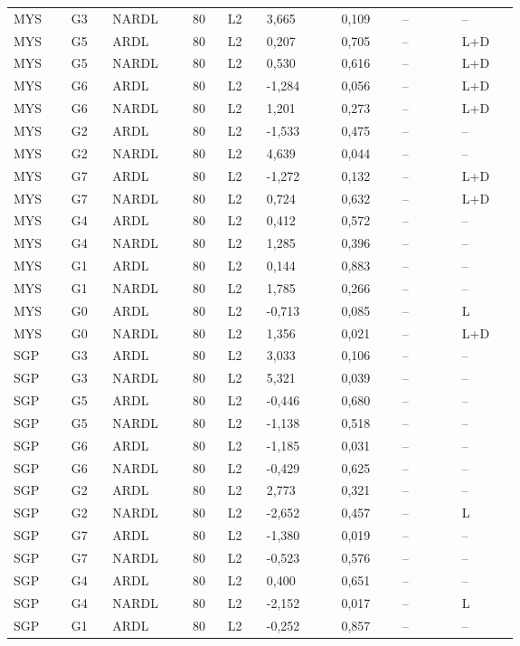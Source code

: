 {\begin{longtable}{p{0.075\linewidth}p{0.05\linewidth}p{0.09\linewidth}p{0.04\linewidth}p{0.05\linewidth}p{0.1\linewidth}p{0.085\linewidth}p{0.085\linewidth}p{0.075\linewidth}}
MYS & G3 & NARDL & 80 & L2 & 3,665 & 0,109 & -- & --\\
MYS & G5 & ARDL & 80 & L2 & 0,207 & 0,705 & -- & L+D\\
MYS & G5 & NARDL & 80 & L2 & 0,530 & 0,616 & -- & L+D\\
MYS & G6 & ARDL & 80 & L2 & -1,284 & 0,056 & -- & L+D\\
MYS & G6 & NARDL & 80 & L2 & 1,201 & 0,273 & -- & L+D\\
MYS & G2 & ARDL & 80 & L2 & -1,533 & 0,475 & -- & --\\
MYS & G2 & NARDL & 80 & L2 & 4,639 & 0,044 & -- & --\\
MYS & G7 & ARDL & 80 & L2 & -1,272 & 0,132 & -- & L+D\\
MYS & G7 & NARDL & 80 & L2 & 0,724 & 0,632 & -- & L+D\\
MYS & G4 & ARDL & 80 & L2 & 0,412 & 0,572 & -- & --\\
MYS & G4 & NARDL & 80 & L2 & 1,285 & 0,396 & -- & --\\
MYS & G1 & ARDL & 80 & L2 & 0,144 & 0,883 & -- & --\\
MYS & G1 & NARDL & 80 & L2 & 1,785 & 0,266 & -- & --\\
MYS & G0 & ARDL & 80 & L2 & -0,713 & 0,085 & -- & L\\
MYS & G0 & NARDL & 80 & L2 & 1,356 & 0,021 & -- & L+D\\
SGP & G3 & ARDL & 80 & L2 & 3,033 & 0,106 & -- & --\\
SGP & G3 & NARDL & 80 & L2 & 5,321 & 0,039 & -- & --\\
SGP & G5 & ARDL & 80 & L2 & -0,446 & 0,680 & -- & --\\
SGP & G5 & NARDL & 80 & L2 & -1,138 & 0,518 & -- & --\\
SGP & G6 & ARDL & 80 & L2 & -1,185 & 0,031 & -- & --\\
SGP & G6 & NARDL & 80 & L2 & -0,429 & 0,625 & -- & --\\
SGP & G2 & ARDL & 80 & L2 & 2,773 & 0,321 & -- & --\\
SGP & G2 & NARDL & 80 & L2 & -2,652 & 0,457 & -- & L\\
SGP & G7 & ARDL & 80 & L2 & -1,380 & 0,019 & -- & --\\
SGP & G7 & NARDL & 80 & L2 & -0,523 & 0,576 & -- & --\\
SGP & G4 & ARDL & 80 & L2 & 0,400 & 0,651 & -- & --\\
SGP & G4 & NARDL & 80 & L2 & -2,152 & 0,017 & -- & L\\
SGP & G1 & ARDL & 80 & L2 & -0,252 & 0,857 & -- & --\\

\end{longtable}}

